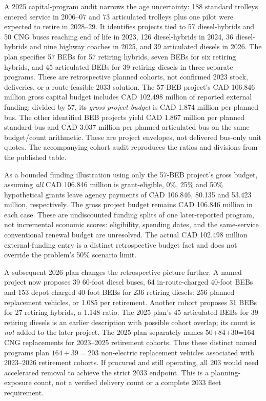 \documentclass[12pt,letterpaper]{article}
\begin{document}
A 2025 capital-program audit narrows the age uncertainty: 188 standard trolleys entered service in 2006--07 and 73 articulated trolleys plus one pilot were expected to retire in 2028--29. It identifies projects tied to 57 diesel-hybrids and 50 CNG buses reaching end of life in 2023, 126 diesel-hybrids in 2024, 36 diesel-hybrids and nine highway coaches in 2025, and 39 articulated diesels in 2026. The plan specifies 57 BEBs for 57 retiring hybrids, seven BEBs for six retiring hybrids, and 45 articulated BEBs for 39 retiring diesels in three separate programs. These are retrospective planned cohorts, not confirmed 2023 stock, deliveries, or a route-feasible 2033 solution. The 57-BEB project's CAD 106.846 million gross capital budget includes CAD 102.498 million of reported external funding; divided by 57, its \emph{gross project budget} is CAD 1.874 million per planned bus. The other identified BEB projects yield CAD 1.867 million per planned standard bus and CAD 3.037 million per planned articulated bus on the same budget/count arithmetic. These are project envelopes, not delivered bus-only unit quotes. The accompanying cohort audit reproduces the ratios and divisions from the published table.\cite{budget2025}

As a bounded funding illustration using only the 57-BEB project's gross budget, assuming \emph{all} CAD 106.846 million is grant-eligible, 0\%, 25\% and 50\% hypothetical grants leave agency payments of CAD 106.846, 80.135 and 53.423 million, respectively. The gross project budget remains CAD 106.846 million in each case. These are undiscounted funding splits of one later-reported program, not incremental economic scores: eligibility, spending dates, and the same-service conventional renewal budget are unresolved. The actual CAD 102.498 million external-funding entry is a distinct retrospective budget fact and does not override the problem's 50\% scenario limit.\cite{budget2025}

A subsequent 2026 plan changes the retrospective picture further. A named project now proposes 39 60-foot diesel buses, 64 in-route-charged 40-foot BEBs and 153 depot-charged 40-foot BEBs for 236 retiring diesels: 256 planned replacement vehicles, or 1.085 per retirement. Another cohort proposes 31 BEBs for 27 retiring hybrids, a 1.148 ratio. The 2025 plan's 45 articulated BEBs for 39 retiring diesels is an earlier description with possible cohort overlap; its count is \emph{not} added to the later project. The 2025 plan separately names 50+84+30=164 CNG replacements for 2023--2025 retirement cohorts. Thus these distinct named programs plan $164+39=203$ non-electric replacement vehicles associated with 2023--2026 retirement cohorts. If procured and still operating, all 203 would need accelerated removal to achieve the strict 2033 endpoint. This is a planning-exposure count, not a verified delivery count or a complete 2033 fleet requirement.\cite{budget2025,budget2026}
\end{document}
